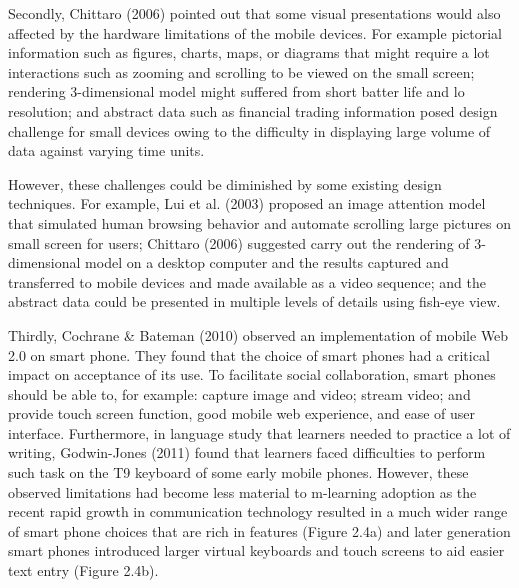 Secondly, Chittaro (2006) \cite{chittaro2006visualizing} pointed out that some visual presentations would also affected by the hardware limitations of the mobile devices. For example pictorial information such as figures, charts, maps, or diagrams that might require a lot interactions such as zooming and scrolling to be viewed on the small screen; rendering 3-dimensional model might suffered from short batter life and lo resolution; and abstract data such as financial trading information posed design challenge for small devices owing to the difficulty in displaying large volume of data against varying time units.

However, these challenges could be diminished by some existing design techniques. For example, Lui et al. (2003) \cite{liu2003automatic} proposed an image attention model that simulated human browsing behavior and automate scrolling large pictures on small screen for users; Chittaro (2006) \cite{chittaro2006visualizing} suggested carry out the rendering of 3-dimensional model on a desktop computer and the results captured and transferred to mobile devices and made available as a video sequence; and the abstract data could be presented in multiple levels of details using fish-eye view. 

Thirdly, Cochrane \& Bateman (2010) \cite{cochrane2010smartphones} observed an implementation of mobile Web 2.0 on smart phone. They found that the choice of smart phones had a critical impact on acceptance of its use. To facilitate social collaboration, smart phones should be able to, for example: capture image and video; stream video; and provide touch screen function, good mobile web experience, and ease of user interface. Furthermore, in language study that learners needed to practice a lot of writing, Godwin-Jones (2011) \cite{godwin2011emerging} found that learners faced difficulties to perform such task on the T9 keyboard of some early mobile phones. However, these observed limitations had become less material to m-learning adoption as the recent rapid growth in communication technology resulted in a much wider range of smart phone choices that are rich in features (Figure 2.4a) and later generation smart phones introduced larger virtual keyboards and touch screens to aid easier text entry (Figure 2.4b).

